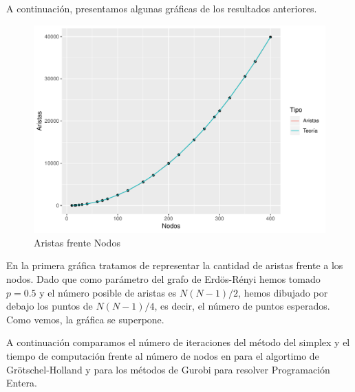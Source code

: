 \documentclass[twoside,a4paper,openright,12pt,tikz]{book}
\begin{document}
\newpage
A continuación, presentamos algunas gráficas de los resultados anteriores.
\begin{figure}[h]
\centering
\includegraphics[scale=0.75]{plot1}
\caption{Aristas frente Nodos}
\end{figure}

En la primera gráfica tratamos de representar la cantidad de aristas frente a los nodos. Dado que como parámetro del grafo de Erdös-Rényi hemos tomado $p=0.5$ y el número posible de aristas es $N(N-1)/2$, hemos dibujado por debajo los puntos de $N(N-1)/4$, es decir, el número de puntos esperados. Como vemos, la gráfica se superpone.

A continuación comparamos el número de iteraciones del método del simplex y el tiempo de computación frente al número de nodos en para el algortimo de Grötschel-Holland y para los métodos de Gurobi para resolver Programación Entera.
\end{document}

